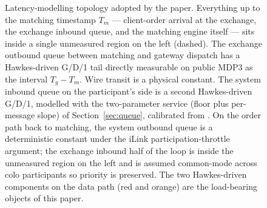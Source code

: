 \documentclass[11pt]{article}
\begin{document}
\begin{figure}[htbp]
{%
}
\caption{Latency-modelling topology adopted by the paper. Everything up to the matching timestamp $T_m$ --- client-order arrival at the exchange, the exchange inbound queue, and the matching engine itself --- sits inside a single unmeasured region on the left (dashed). The exchange outbound queue between matching and gateway dispatch has a Hawkes-driven G/D/1 tail directly measurable on public MDP3 as the interval $T_g - T_m$. Wire transit is a physical constant. The system inbound queue on the participant's side is a second Hawkes-driven G/D/1, modelled with the two-parameter service (floor plus per-message slope) of Section~\ref{sec:queue}, calibrated from \citet{mayeski_actorhft}. On the order path back to matching, the system outbound queue is a deterministic constant under the iLink participation-throttle argument; the exchange inbound half of the loop is inside the unmeasured region on the left and is assumed common-mode across colo participants so priority is preserved. The two Hawkes-driven components on the data path (red and orange) are the load-bearing objects of this paper.}
\label{fig:latency-topology}
\end{figure}
\end{document}

